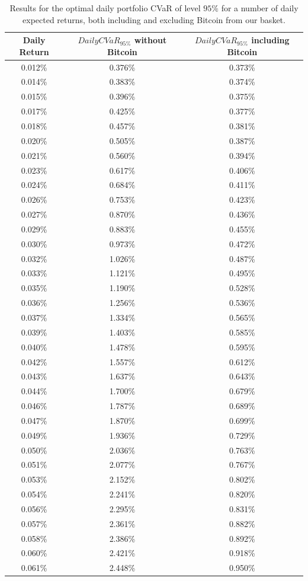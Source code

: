 \begin{table}
	\small
	\centering
	\caption[CVaR efficient frontier on returns]{Results for the optimal daily portfolio CVaR of level $95\%$ for a number of daily expected returns, both including and excluding Bitcoin from our basket.}
	\label{tab:return_cvar}
\begin{tabular}{ccc}
	
	Daily Return & $DailyCVaR_{95\%}$ without Bitcoin & $DailyCVaR_{95\%}$ including Bitcoin \\
	\midrule
	0.012\% & 0.376\% & 0.373\% \\
	0.014\% & 0.383\% & 0.374\% \\
	0.015\% & 0.396\% & 0.375\% \\
	0.017\% & 0.425\% & 0.377\% \\
	0.018\% & 0.457\% & 0.381\% \\
	0.020\% & 0.505\% & 0.387\% \\
	0.021\% & 0.560\% & 0.394\% \\
	0.023\% & 0.617\% & 0.406\% \\
	0.024\% & 0.684\% & 0.411\% \\
	0.026\% & 0.753\% & 0.423\% \\
	0.027\% & 0.870\% & 0.436\% \\
	0.029\% & 0.883\% & 0.455\% \\
	0.030\% & 0.973\% & 0.472\% \\
	0.032\% & 1.026\% & 0.487\% \\
	0.033\% & 1.121\% & 0.495\% \\
	0.035\% & 1.190\% & 0.528\% \\
	0.036\% & 1.256\% & 0.536\% \\
	0.037\% & 1.334\% & 0.565\% \\
	0.039\% & 1.403\% & 0.585\% \\
	0.040\% & 1.478\% & 0.595\% \\
	0.042\% & 1.557\% & 0.612\% \\
	0.043\% & 1.637\% & 0.643\% \\
	0.044\% & 1.700\% & 0.679\% \\
	0.046\% & 1.787\% & 0.689\% \\
	0.047\% & 1.870\% & 0.699\% \\
	0.049\% & 1.936\% & 0.729\% \\
	0.050\% & 2.036\% & 0.763\% \\
	0.051\% & 2.077\% & 0.767\% \\
	0.053\% & 2.152\% & 0.802\% \\
	0.054\% & 2.241\% & 0.820\% \\
	0.056\% & 2.295\% & 0.831\% \\
	0.057\% & 2.361\% & 0.882\% \\
	0.058\% & 2.386\% & 0.892\% \\
	0.060\% & 2.421\% & 0.918\% \\
	0.061\% & 2.448\% & 0.950\% \\
	\midrule
\end{tabular}

\end{table}


